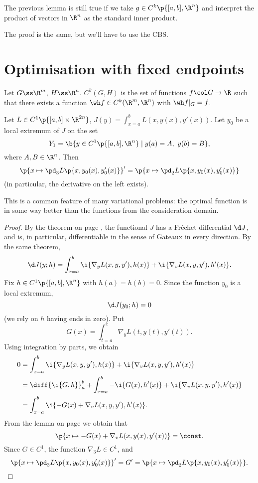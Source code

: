 \begin{lemma}
  \label{DR for inner product}
  The previous lemma is still true if we take $g \in C^k\p{[a, b], \R^n}$ and interpret the product of vectors in $\R^n$ as the standard inner product.
\end{lemma}

\begin{idea}
  The proof is the same, but we'll have to use the CBS.
\end{idea}

\section{Optimisation with fixed endpoints}

\begin{definition}[reminder]
  Let $G \ss \R^m$, $H \ss \R^n$. $C^k(G, H)$ is the set of functions $f \col G \to \R$ such that there exists a function $\wh f \in C^k(\R^m, \R^n)$ with $\wh f|_G = f$.
\end{definition}

\begin{theorem}
  Let $L \in C^1\p{[a, b]\times \R^{2n}}$, $J(y) = \int_{x=a}^b L(x, y(x), y'(x))$. Let $y_0$ be a local extremum of $J$ on the set
  $$ Y_1 = \b{y \in C^1\p{[a, b], \R^n} \mid y(a)=A,\ y(b)=B}, $$
  where $A, B \in \R^n$.
  Then
  $$
  \p{x \mapsto \pd_3 L\p{x, y_0(x), y_0'(x)}}'
  = \p{ x \mapsto \pd_2 L\p{x,y_0(x),y_0'(x)} } $$
  (in particular, the derivative on the left exists).
\end{theorem}

This is a common feature of many variational problems: the optimal function is in some way better than the functions from the consideration domain.

\begin{proof}
  By the theorem on page \pageref{good functionals are Fréchet differentiable}, the functional $J$ has a Fréchet differential $\d J$, and is, in particular, differentiable in the sense of Gateaux in every direction.
  By the same theorem,
  $$ \d J(y; h) = \int_{x=a}^b \i{\nabla_y L(x, y, y'), h(x)} + \i{\nabla_v L(x, y, y'), h'(x)}. $$
    Fix $h \in C^1\p{[a, b], \R^n}$ with $h(a) = h(b) = 0$.
  Since the function $y_0$ is a local extremum,
  $$ \d J(y_0; h) = 0 $$
  (we rely on $h$ having ends in zero).
  Put
  $$ G(x) = \int_{t=a}^x  \nabla_y L(t, y(t), y'(t)). $$
  Using integration by parts, we obtain
  \begin{align*}
    0
    &=\int_{x=a}^b \i{\nabla_y L(x, y, y'), h(x)} + \i{\nabla_v L(x, y, y'), h'(x)} \\
    &= \diff{\i{G, h}}_a^b + \int_{x=a}^b -\i{G(x), h'(x)} + \i{\nabla_v L(x, y, y'), h'(x)} \\
    &= \int_{x=a}^b \i{-G(x)+\nabla_v L(x, y, y'), h'(x)}.
  \end{align*}
  From the lemma on page \pageref{DR for inner product} we obtain that
  $$ \p{x \mapsto -G(x)+\nabla_v L(x, y(x), y'(x))} = \const. $$
  Since $G \in C^1$, the function $\nabla_3L \in C^1$, and
  $$
  \p{x \mapsto \pd_3 L\p{x, y_0(x), y_0'(x)}}' = G'
  = \p{ x \mapsto \pd_2 L\p{x,y_0(x),y_0'(x)} }. $$
\end{proof}

